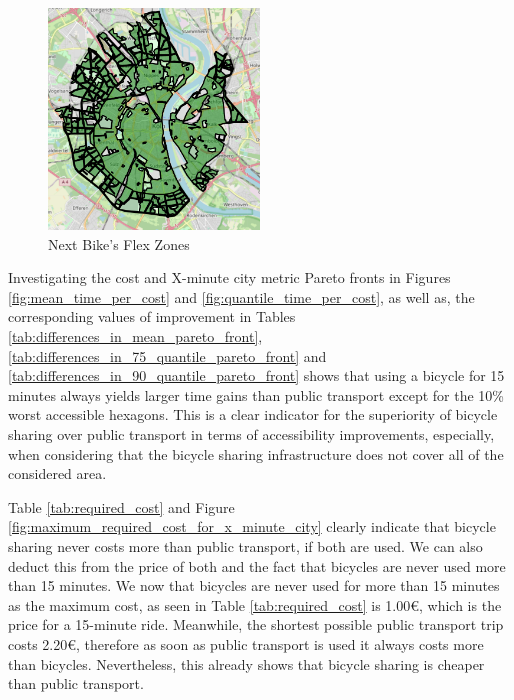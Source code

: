 \begin{figure}
  \begin{center}
    \includegraphics[width=0.50\textwidth]{Figures/discussion/flex_zones.png}
  \end{center}
  \caption{Next Bike's Flex Zones}
  \label{fig:flex_zones}
\end{figure}

Investigating the cost and X-minute city metric Pareto fronts in Figures \ref{fig:mean_time_per_cost} and \ref{fig:quantile_time_per_cost}, as well as, the corresponding values of improvement in Tables \ref{tab:differences_in_mean_pareto_front}, \ref{tab:differences_in_75_quantile_pareto_front} and \ref{tab:differences_in_90_quantile_pareto_front} shows that using a bicycle for 15 minutes always yields larger time gains than public transport except for the 10\% worst accessible hexagons.
This is a clear indicator for the superiority of bicycle sharing over public transport in terms of accessibility improvements, especially, when considering that the bicycle sharing infrastructure does not cover all of the considered area.


Table \ref{tab:required_cost} and Figure \ref{fig:maximum_required_cost_for_x_minute_city} clearly indicate that bicycle sharing never costs more than public transport, if both are used.
We can also deduct this from the price of both and the fact that bicycles are never used more than 15 minutes.
We now that bicycles are never used for more than 15 minutes as the maximum cost, as seen in Table \ref{tab:required_cost} is 1.00€, which is the price for a 15-minute ride.
Meanwhile, the shortest possible public transport trip costs 2.20€, therefore as soon as public transport is used it always costs more than bicycles.
Nevertheless, this already shows that bicycle sharing is cheaper than public transport. 

